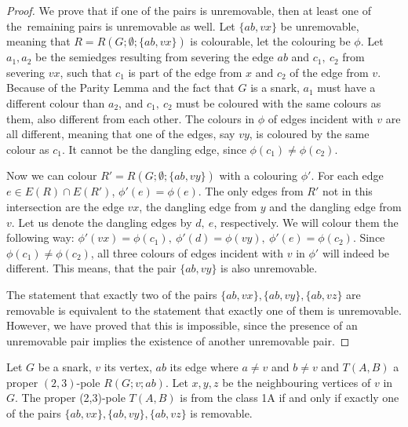\begin{proof}
	We prove that if one of the pairs is unremovable, then at least one of the~remaining pairs is unremovable as well. Let $\{ab,vx\}$ be unremovable, meaning that $R=R(G;\emptyset;\{ab,vx\})$ is colourable, let the colouring be $\phi$. Let $a_1,a_2$ be the semiedges resulting from severing the edge $ab$ and $c_1,~ c_2$ from severing $vx$, such that $c_1$ is part of the edge from $x$ and $c_2$ of the edge from $v$. Because of the Parity Lemma and the fact that $G$ is a snark, $a_1$ must have a different colour than $a_2$, and $c_1,~ c_2$ must be coloured with the same colours as them, also different from each other. The colours in $\phi$ of edges incident with $v$ are all different, meaning that one of the edges, say $vy$, is coloured by the same colour as $c_1$. It cannot be the dangling edge, since $\phi(c_1)\neq \phi(c_2)$.
	
	Now we can colour $R'=R(G;\emptyset;\{ab,vy\})$ with a colouring $\phi'$. For each edge $e\in E(R)\cap E(R')$, $\phi'(e)=\phi(e)$. The only edges from $R'$ not in this intersection are the edge $vx$, the dangling edge from $y$ and the dangling edge from $v$. Let us denote the dangling edges by $d,~e$, respectively. We will colour them the following way: $\phi'(vx)=\phi(c_1),~\phi'(d)=\phi(vy),~\phi'(e)=\phi(c_2)$. Since $\phi(c_1)\neq \phi(c_2)$, all three colours of edges incident with $v$ in $\phi'$ will indeed be different. This means, that the pair $\{ab,vy\}$ is also unremovable.
	
	The statement that exactly two of the pairs $\{ab,vx\}, \{ab,vy\}, \{ab,vz\}$ are removable is equivalent to the statement that exactly one of them is unremovable. However, we have proved that this is impossible, since the presence of an unremovable pair implies the existence of another unremovable pair.
\end{proof}

\begin{proposition}
	Let $G$ be a snark, $v$ its vertex, $ab$ its edge where $a\neq v$ and $b \neq v$ and $T(A,B)$ a proper $(2,3)$-pole $R(G;v;ab)$. Let $x,y,z$ be the neighbouring vertices of $v$ in $G$. The proper (2,3)-pole $T(A,B)$ is from the class 1A if and only if exactly one of the pairs $\{ab,vx\}, \{ab,vy\}, \{ab,vz\}$ is removable.
	\label{prop:1A-one-pair}
\end{proposition}

